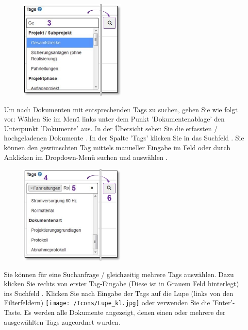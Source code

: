 \begin{figure}
\vspace{-30pt}
\includegraphics[height=50mm]{../chapters/11_Dokumentenablage/pictures/11-2-8_DokTagHinzufuegen.jpg}
\end{figure}
Um nach Dokumenten mit entsprechenden Tags zu suchen, gehen Sie wie folgt vor:
Wählen Sie im Menü links unter dem Punkt 'Dokumentenablage' den Unterpunkt 'Dokumente' aus. In der Übersicht sehen Sie die erfassten / hochgeladenen Dokumente . In der Spalte 'Tags' klicken Sie in das Suchfeld . Sie können den gewünschten Tag mittels manueller Eingabe im Feld oder durch Anklicken im Dropdown-Menü suchen und auswählen .

\vspace{\baselineskip}

\begin{figure}
\vspace{-30pt}
\includegraphics[height=50mm]{../chapters/11_Dokumentenablage/pictures/11-2-8_TagEingabe.jpg}
\end{figure}
Sie können für eine Suchanfrage / gleichzeitig mehrere Tags auswählen. Dazu klicken Sie rechts von erster Tag-Eingabe  (Diese ist in Grauem Feld hinterlegt) ins Suchfeld . Klicken Sie nach Eingabe der Tags auf die Lupe (links von den Filterfeldern) \texttt{[image: /Icons/Lupe\_kl.jpg]}  oder verwenden Sie die 'Enter'-Taste. Es werden alle Dokumente angezeigt, denen einen oder mehrere der ausgewählten Tags zugeordnet wurden.

